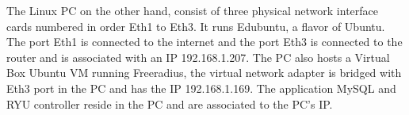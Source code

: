 The Linux PC on the other hand, consist of three physical network interface cards numbered in order Eth1 to Eth3. It runs Edubuntu, a flavor of Ubuntu. The port Eth1 is connected to the internet and the port Eth3 is connected to the router and is associated with an IP 192.168.1.207. The PC also hosts a Virtual Box Ubuntu VM running Freeradius, the virtual network adapter is bridged with Eth3 port in the PC and has the IP 192.168.1.169. The application MySQL and RYU controller reside in the PC and are associated to the PC’s IP.
%	

